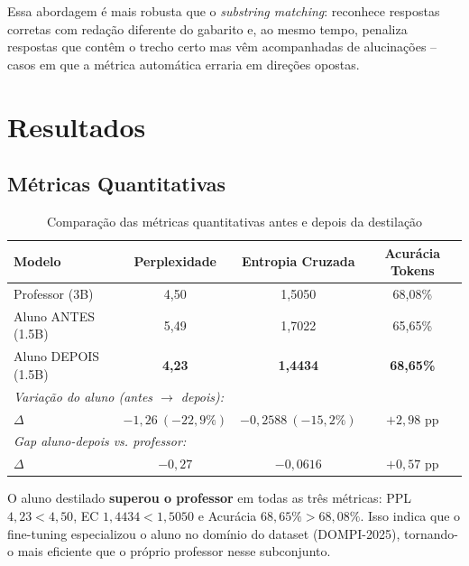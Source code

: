 \documentclass[12pt, a4paper]{article}
\begin{document}
Essa abordagem é mais robusta que o \textit{substring matching}: reconhece respostas
corretas com redação diferente do gabarito e, ao mesmo tempo, penaliza respostas que
contêm o trecho certo mas vêm acompanhadas de alucinações -- casos em que a métrica
automática erraria em direções opostas.

\section{Resultados}

\subsection{Métricas Quantitativas}

\begin{table}[H]
\centering
\caption{Comparação das métricas quantitativas antes e depois da destilação}
\begin{tabular}{lccc}
\toprule
\textbf{Modelo} & \textbf{Perplexidade} & \textbf{Entropia Cruzada} & \textbf{Acurácia Tokens} \\
\midrule
\rowcolor{lightblue}
Professor (3B)    & 4,50 & 1,5050 & 68,08\% \\
Aluno ANTES (1.5B) & 5,49 & 1,7022 & 65,65\% \\
\rowcolor{lightgreen}
Aluno DEPOIS (1.5B) & \textbf{4,23} & \textbf{1,4434} & \textbf{68,65\%} \\
\midrule
\multicolumn{4}{l}{\textit{Variação do aluno (antes $\rightarrow$ depois):}} \\
$\Delta$ & $-1,26\ (-22{,}9\%)$ & $-0,2588\ (-15{,}2\%)$ & $+2,98$ pp \\
\multicolumn{4}{l}{\textit{Gap aluno-depois vs. professor:}} \\
$\Delta$ & $-0,27$ & $-0,0616$ & $+0,57$ pp \\
\bottomrule
\end{tabular}
\end{table}

\begin{successbox}
O aluno destilado \textbf{superou o professor} em todas as três métricas:
PPL $4{,}23 < 4{,}50$, EC $1{,}4434 < 1{,}5050$ e Acurácia $68{,}65\% > 68{,}08\%$.
Isso indica que o fine-tuning especializou o aluno no domínio do dataset (DOMPI-2025),
tornando-o mais eficiente que o próprio professor nesse subconjunto.
\end{successbox}
\end{document}
